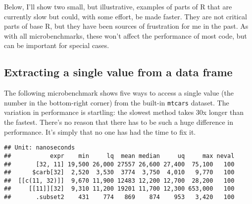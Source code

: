 Below, I'll show two small, but illustrative, examples of parts of R
that are currently slow but could, with some effort, be made faster.
They are not critical parts of base R, but they have been sources of
frustration for me in the past. As with all microbenchmarks, these won't
affect the performance of most code, but can be important for special
cases.

\hypertarget{extracting-a-single-value-from-a-data-frame}{%
\subsection{Extracting a single value from a data
frame}\label{extracting-a-single-value-from-a-data-frame}}

The following microbenchmark shows five ways to access a single value
(the number in the bottom-right corner) from the built-in
\texttt{mtcars} dataset. The variation in performance is startling: the
slowest method takes 30x longer than the fastest. There's no reason that
there has to be such a huge difference in performance. It's simply that
no one has had the time to fix it. 
\indexc{[}

\begin{Shaded}
\begin{Highlighting}[]
\NormalTok{(}
  \NormalTok{      =}\StringTok{ }\NormalTok{mtcars[}\NormalTok{, }\NormalTok{],}
  \NormalTok{     =}\StringTok{ }\OperatorTok{$}\NormalTok{carb[}\NormalTok{],}
  \NormalTok{ =}\StringTok{ }\NormalTok{mtcars[[}\NormalTok{(}\NormalTok{, }\NormalTok{)]],}
  \NormalTok{    =}\StringTok{ }\NormalTok{mtcars[[}\NormalTok{]][}\NormalTok{],}
  \NormalTok{      =}\StringTok{ }\NormalTok{)[}\NormalTok{]}
\NormalTok{)}
\end{Highlighting}
\end{Shaded}

\begin{verbatim}
## Unit: nanoseconds
##           expr    min     lq  mean median     uq     max neval
##       [32, 11] 19,500 26,000 27557 26,600 27,400  75,100   100
##      $carb[32]  2,520  3,530  3774  3,750  4,010   9,770   100
##  [[c(11, 32)]]  9,670 11,900 12483 12,200 12,700  28,200   100
##     [[11]][32]  9,310 11,200 19201 11,700 12,300 653,000   100
##       .subset2    431    774   869    874    953   3,420   100
\end{verbatim}

